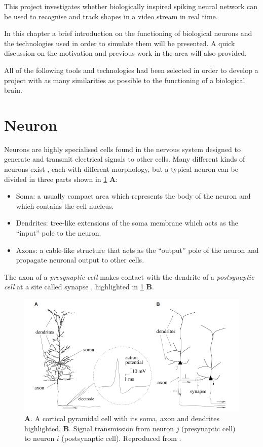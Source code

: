 This project investigates whether biologically inspired spiking neural network can be used to recognise and track shapes in a video stream in real time. 

In this chapter a brief introduction on the functioning of biological neurons and the technologies used in order to simulate them will be presented. A quick discussion on the motivation and previous work in the area will also provided. 

All of the following tools and technologies had been selected in order to develop a project with as many similarities as possible to the functioning of a biological brain. 

\section{Neuron}
Neurons are highly specialised cells found in the nervous system designed to generate and transmit electrical signals to other cells. Many different kinds of neurons exist \cite{Llinas:2008}, each with different morphology, but a typical neuron can be divided in three parts shown in \cref{fig:neuron_morphology} \textbf{A}:
\begin{itemize}
    \item Soma: a usually compact area which represents the body of the neuron and which contains the cell nucleus.
    \item Dendrites: tree-like extensions of the soma membrane which acts as the ``input'' pole to the neuron.
    \item Axons: a cable-like structure that acts as the ``output'' pole of the neuron and propagate neuronal output to other cells.
\end{itemize}
The axon of a \textit{presynaptic cell} makes contact with the dendrite of a \textit{postsynaptic cell} at a site called synapse \cite{Gerstner:2014}, highlighted in \cref{fig:neuron_morphology} \textbf{B}.

\begin{figure}[ht]
\centering
\includegraphics[scale=0.6]{images/neuron.png}
\caption[Neuron Morphology]{\textbf{A}. A cortical pyramidal cell with its soma, axon and dendrites highlighted. \textbf{B}. Signal transmission from neuron $j$ (presynaptic cell) to neuron $i$ (postsynaptic cell). Reproduced from \cite{Gerstner:2014}.}
\label{fig:neuron_morphology}
\end{figure}

